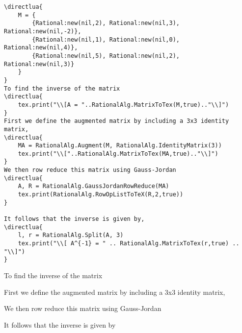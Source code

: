 \documentclass[11pt]{article}
\begin{document}
\begin{lstlisting}
\directlua{
    M = {
        {Rational:new(nil,2), Rational:new(nil,3), Rational:new(nil,-2)},
        {Rational:new(nil,1), Rational:new(nil,0), Rational:new(nil,4)},
        {Rational:new(nil,5), Rational:new(nil,2), Rational:new(nil,3)}    
    }
}
To find the inverse of the matrix
\directlua{
    tex.print("\\[A = "..RationalAlg.MatrixToTex(M,true).."\\]")
}
First we define the augmented matrix by including a 3x3 identity matrix,
\directlua{
    MA = RationalAlg.Augment(M, RationalAlg.IdentityMatrix(3))
    tex.print("\\["..RationalAlg.MatrixToTex(MA,true).."\\]")
}
We then row reduce this matrix using Gauss-Jordan
\directlua{
    A, R = RationalAlg.GaussJordanRowReduce(MA)
    tex.print(RationalAlg.RowOpListToTeX(R,2,true))
}

It follows that the inverse is given by,
\directlua{
    l, r = RationalAlg.Split(A, 3)
    tex.print("\\[ A^{-1} = " .. RationalAlg.MatrixToTex(r,true) .. "\\]")
}
\end{lstlisting}


To find the inverse of the matrix

First we define the augmented matrix by including a 3x3 identity matrix,


We then row reduce this matrix using Gauss-Jordan


It follows that the inverse is given by

\end{document}
